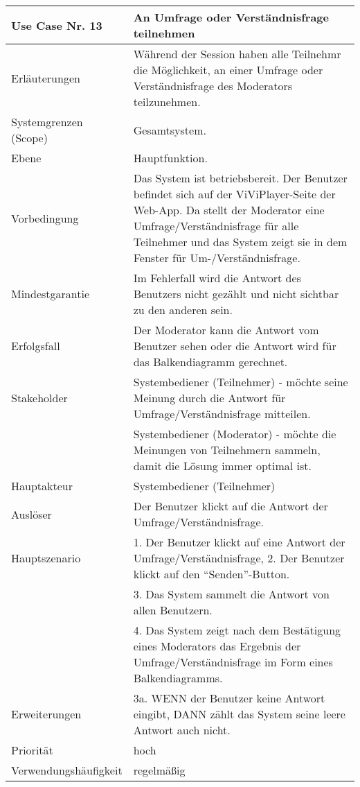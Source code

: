 \begin{tabularx}{\linewidth}{|l|X|}
	\hline
	Use Case Nr. 13			& \textbf{An Umfrage oder Verständnisfrage teilnehmen} \\ \hline
	Erläuterungen			& Während der Session haben alle Teilnehmr die Möglichkeit, an einer 
							  Umfrage oder Verständnisfrage des Moderators teilzunehmen. \\ \hline
	Systemgrenzen (Scope)	& Gesamtsystem. \\ \hline
	Ebene					& Hauptfunktion. \\ \hline
	Vorbedingung			& Das System ist betriebsbereit. Der Benutzer befindet sich auf der 
							  ViViPlayer-Seite der Web-App. Da stellt der Moderator eine Umfrage/Verständnisfrage für alle Teilnehmer und das System zeigt sie in dem Fenster für Um-/Verständnisfrage. \\ \hline
	Mindestgarantie			& Im Fehlerfall wird die Antwort des Benutzers nicht gezählt und 
							  nicht sichtbar zu den anderen sein. \\ \hline
	Erfolgsfall				& Der Moderator kann die Antwort vom Benutzer sehen oder die Antwort 
							  wird für das Balkendiagramm gerechnet. \\ \hline
	Stakeholder				& Systembediener (Teilnehmer) - möchte seine Meinung durch die 
							  Antwort für Umfrage/Verständnisfrage mitteilen. \\
							& Systembediener (Moderator) - möchte die Meinungen von Teilnehmern
							  sammeln, damit die Lösung immer optimal ist. \\ \hline
	Hauptakteur				& Systembediener (Teilnehmer) \\ \hline
	Auslöser				& Der Benutzer klickt auf die Antwort der Umfrage/Verständnisfrage. \\
							  \hline	
	Hauptszenario			& 1. Der Benutzer klickt auf eine Antwort der Umfrage/Verständnisfrage,
	                          2. Der Benutzer klickt auf den ``Senden''-Button. \\
							& 3. Das System sammelt die Antwort von allen Benutzern. \\
							& 4. Das System zeigt nach dem Bestätigung eines Moderators das Ergebnis der
							  Umfrage/Verständnisfrage im Form eines Balkendiagramms. \\ \hline
	Erweiterungen			& 3a. WENN der Benutzer keine Antwort eingibt, DANN zählt das System 
							  seine leere Antwort auch nicht. \\ \hline
	Priorität				& hoch \\ \hline
	Verwendungshäufigkeit	& regelmäßig \\ \hline
\end{tabularx}

